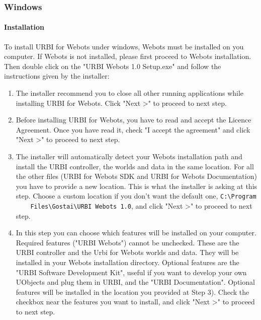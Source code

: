 \subsubsection{Windows}
\label{webots.setup.windows}%

\paragraph{Installation}
\label{webots.setup.windows.installation}%

To install URBI for Webots under windows, Webots must be installed on
you computer. If Webots is not installed, please first proceed to
Webots installation. Then double click on the "URBI Webots 1.0
Setup.exe" and follow the instructions given by the installer:

\begin{enumerate}

\item The installer recommend you to close all other running
  applications while installing URBI for Webots. Click "Next >{}" to
  proceed to next step.

\item Before installing URBI for Webots, you have to read and accept
  the Licence Agreement. Once you have read it, check "I accept the
  agreement" and click "Next >{}" to proceed to next step.

\item The installer will automatically detect your Webots installation
  path and install the URBI controller, the worlds and data in the
  same location. For all the other files (URBI for Webots SDK and URBI
  for Webots Documentation) you have to provide a new location. This
  is what the installer is asking at this step. Choose a custom
  location if you don't want the default one, \nolinkurl{C:\Program
    Files\Gostai\URBI Webots 1.0}, and click "Next >{}" to proceed to
  next step.

\item In this step you can choose which features will be installed on
  your computer. Required features ("URBI Webots") cannot be
  unchecked. These are the URBI controller and the Urbi for Webots
  worlds and data. They will be installed in your Webots installation
  directory. Optional features are the "URBI Software Development
  Kit", useful if you want to develop your own UObjects and plug them
  in URBI, and the "URBI Documentation". Optional features will be
  installed in the location you provided at Step 3).  Check the
  checkbox near the features you want to install, and click "Next >{}"
  to proceed to next step.


\end{enumerate}
